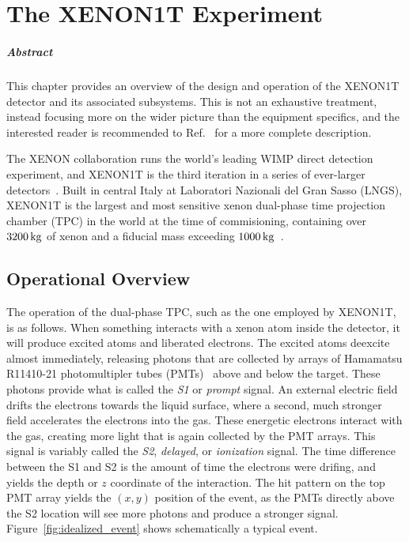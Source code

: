 
\chapter{The XENON1T Experiment}\label{ch:xe1t}

\paragraph{Abstract} This chapter provides an overview of the design and operation of the XENON1T detector and its associated subsystems. This is not an exhaustive treatment, instead focusing more on the wider picture than the equipment specifics, and the interested reader is recommended to Ref.~\cite{Aprile:2017aty} for a more complete description.

The XENON collaboration runs the world's leading WIMP direct detection experiment, and XENON1T is the third iteration in a series of ever-larger detectors~\cite{Angle:2007uj,Aprile:2011dd}. Built in central Italy at Laboratori Nazionali del Gran Sasso (LNGS), XENON1T is the largest and most sensitive xenon dual-phase time projection chamber (TPC) in the world at the time of commisioning, containing over $3200\,\mathrm{kg}$ of xenon and a fiducial mass exceeding $1000\,\mathrm{kg}$~\cite{Aprile:2017iyp}.

\section{Operational Overview}

The operation of the dual-phase TPC, such as the one employed by XENON1T, is as follows. When something interacts with a xenon atom inside the detector, it will produce excited atoms and liberated electrons. The excited atoms deexcite almost immediately, releasing photons that are collected by arrays of Hamamatsu R11410-21 photomultipler tubes (PMTs)~\cite{Aprile:2015lha} above and below the target. These photons provide what is called the \textit{S1} or \textit{prompt} signal. An external electric field drifts the electrons towards the liquid surface, where a second, much stronger field accelerates the electrons into the gas. These energetic electrons interact with the gas, creating more light that is again collected by the PMT arrays. This signal is variably called the \textit{S2}, \textit{delayed}, or \textit{ionization} signal. The time difference between the S1 and S2 is the amount of time the electrons were drifing, and yields the depth or $z$ coordinate of the interaction. The hit pattern on the top PMT array yields the $(x,y)$ position of the event, as the PMTs directly above the S2 location will see more photons and produce a stronger signal. Figure~\ref{fig:idealized_event} shows schematically a typical event.

